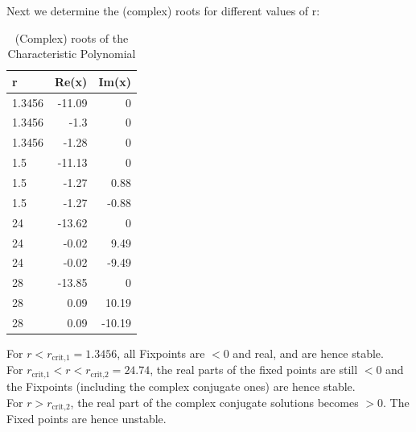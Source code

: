 \documentclass{article}
\begin{document}
Next we determine the (complex) roots for different values of r: \\

\begin{table}[H]
    \centering
\begin{tabular}{lrr}
    \toprule 
    r & Re(x) & Im(x) \\ \midrule 
    1.3456 & -11.09 & 0 \\
    1.3456 & -1.3 & 0 \\
    1.3456 & -1.28 & 0 \\ \midrule
    1.5 & -11.13 & 0 \\
    1.5 & -1.27 & 0.88 \\
    1.5 & -1.27 & -0.88 \\ \midrule
    24 & -13.62 & 0 \\
    24 & -0.02 & 9.49 \\
    24 & -0.02 & -9.49\\ \midrule
    28 & -13.85 & 0 \\ 
    28 & 0.09 & 10.19 \\
    28 & 0.09 & -10.19 \\
    \bottomrule 
\end{tabular}
\caption{(Complex) roots of the Characteristic Polynomial} 
\end{table}
For \( r < r_\text{crit,1} = 1.3456 \), all Fixpoints are \( < 0 \) and real,
and are hence stable.\\
For \(  r_\text{crit,1} < r < r_\text{crit,2} = 24.74\), the real parts of the
fixed points are still \( < 0 \) and the Fixpoints (including the complex
conjugate ones) are hence stable. \\
For \( r > r_\text{crit,2} \), the real part of the complex conjugate solutions
becomes \( > 0 \). The Fixed points are hence unstable. \\
\end{document}
